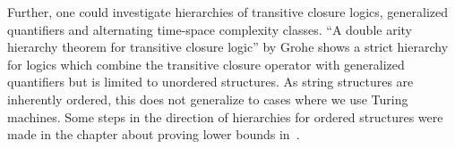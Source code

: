 Further, one could investigate hierarchies of transitive closure logics, generalized quantifiers and alternating time-space complexity classes.
``A double arity hierarchy theorem for transitive closure logic''\cite{Grohe1996} by Grohe shows a strict hierarchy for logics which combine the transitive closure operator with generalized quantifiers but is limited to unordered structures.
As string structures are inherently ordered, this does not generalize to cases where we use Turing machines.
Some steps in the direction of hierarchies for ordered structures were made in the chapter about proving lower bounds in~\cite{descriptive-complexity}.